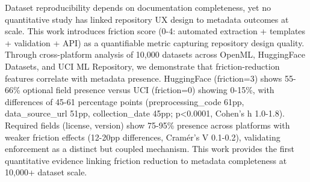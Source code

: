 
Dataset reproducibility depends on documentation completeness, yet no quantitative study has linked repository UX design to metadata outcomes at scale. This work introduces friction score (0-4: automated extraction + templates + validation + API) as a quantifiable metric capturing repository design quality. Through cross-platform analysis of 10,000 datasets across OpenML, HuggingFace Datasets, and UCI ML Repository, we demonstrate that friction-reduction features correlate with metadata presence. HuggingFace (friction=3) shows 55-66\% optional field presence versus UCI (friction=0) showing 0-15\%, with differences of 45-61 percentage points (preprocessing\_code 61pp, data\_source\_url 51pp, collection\_date 45pp; p<0.0001, Cohen's h 1.0-1.8). Required fields (license, version) show 75-95\% presence across platforms with weaker friction effects (12-20pp differences, Cramér's V 0.1-0.2), validating enforcement as a distinct but coupled mechanism. This work provides the first quantitative evidence linking friction reduction to metadata completeness at 10,000+ dataset scale.
